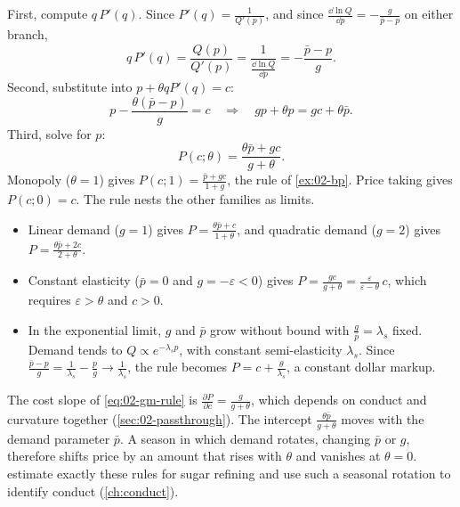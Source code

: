 First, compute $q\,P'(q)$. Since $P'(q) = \frac{1}{Q'(p)}$, and since $\frac{\dd \ln Q}{\dd p} = -\frac{g}{\bar p -
p}$ on either branch,
\begin{equation*}
q\,P'(q) = \frac{Q(p)}{Q'(p)} = \frac{1}{\frac{\dd \ln Q}{\dd p}} = -\frac{\bar p - p}{g} .
\end{equation*}
Second, substitute into $p + \theta q P'(q) = c$:
\begin{equation*}
p - \frac{\theta(\bar p - p)}{g} = c
\quad\Longrightarrow\quad
g p + \theta p = g c + \theta \bar p .
\end{equation*}
Third, solve for $p$:
\begin{equation}\label{eq:02-gm-rule}
P(c;\theta) = \frac{\theta\bar p + g c}{g + \theta} .
\end{equation}
Monopoly ($\theta = 1$) gives $P(c;1) = \frac{\bar p + gc}{1 + g}$, the rule of \cref{ex:02-bp}. Price taking
gives $P(c;0) = c$. The rule nests the other families as limits.
\begin{itemize}
\item Linear demand ($g = 1$) gives $P = \frac{\theta\bar p + c}{1 + \theta}$, and quadratic demand ($g = 2$)
  gives $P = \frac{\theta\bar p + 2c}{2 + \theta}$.
\item Constant elasticity ($\bar p = 0$ and $g = -\varepsilon < 0$) gives $P = \frac{gc}{g + \theta}
  = \frac{\varepsilon}{\varepsilon - \theta}\, c$, which requires $\varepsilon > \theta$ and $c > 0$.
\item In the exponential limit, $g$ and $\bar p$ grow without bound with $\frac{g}{\bar p} = \lambda_s$ fixed. Demand tends to
  $Q \propto e^{-\lambda_s p}$, with constant semi-elasticity $\lambda_s$. Since $\frac{\bar p - p}{g} =
  \frac{1}{\lambda_s} - \frac{p}{g} \to \frac{1}{\lambda_s}$, the rule becomes $P = c + \frac{\theta}{\lambda_s}$, a
  constant dollar markup.
\end{itemize}
The cost slope of \eqref{eq:02-gm-rule} is $\frac{\partial P}{\partial c} = \frac{g}{g + \theta}$, which depends on
conduct and curvature together (\cref{sec:02-passthrough}). The intercept $\frac{\theta\bar p}{g + \theta}$ moves
with the demand parameter $\bar p$. A season in which demand rotates, changing $\bar p$ or $g$, therefore shifts price
by an amount that rises with $\theta$ and vanishes at $\theta = 0$. \citet{GenesoveMullin1998} estimate exactly these rules for sugar refining and
use such a seasonal rotation to identify conduct (\cref{ch:conduct}).
